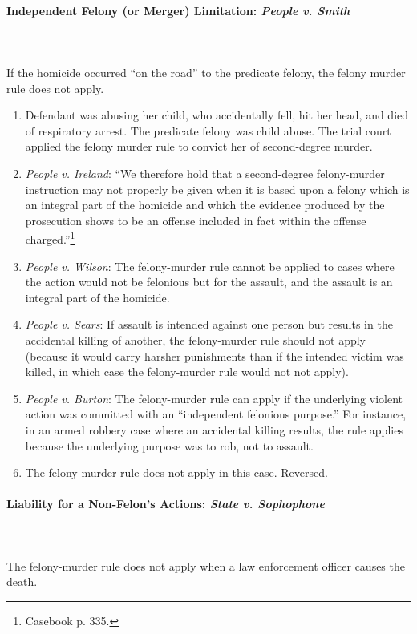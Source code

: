 \paragraph{Independent Felony (or Merger) Limitation: \emph{People v. Smith}}
~\\\\
If the homicide occurred ``on the road'' to the predicate felony, the felony 
murder rule does not apply.

\begin{enumerate}
    \item Defendant was abusing her child, who accidentally fell, hit her 
    head, and died of respiratory arrest. The predicate felony was child 
    abuse. The trial court applied the felony 
    murder rule to convict her of second-degree murder.
    \item \emph{People v. Ireland}: ``We therefore hold that a second-degree 
    felony-murder instruction may not properly be given when it is based upon 
    a felony which is an integral part of the homicide and which the evidence 
    produced by the prosecution shows to be an offense included in fact within 
    the offense charged.''\footnote{Casebook p. 335.}
    \item \emph{People v. Wilson}: The felony-murder rule cannot be applied to 
    cases where the action would not be felonious but for the assault, and the 
    assault is an integral part of the homicide.
    \item \emph{People v. Sears}: If assault is intended against one person 
    but results in the accidental killing of another, the felony-murder rule 
    should not apply (because it would carry harsher punishments than if the 
    intended victim was killed, in which case the felony-murder rule would not 
    not apply).
    \item \emph{People v. Burton}: The felony-murder rule can apply if the 
    underlying violent action was committed with an ``independent felonious 
    purpose.'' For instance, in an armed robbery case where an accidental 
    killing results, the rule applies because the underlying purpose was to 
    rob, not to assault.
    \item The felony-murder rule does not apply in this case. Reversed.
\end{enumerate}

\paragraph{Liability for a Non-Felon's Actions: \emph{State v. Sophophone}}
~\\\\
The felony-murder rule does not apply when a law enforcement officer causes 
the death.

